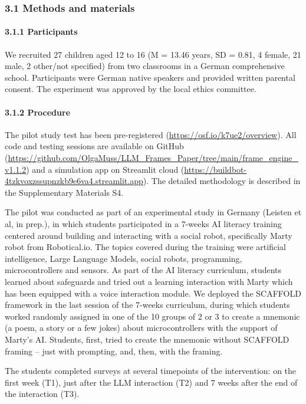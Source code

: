 \documentclass[fleqn,10pt]{wlscirep}
\begin{document}
\subsubsection*{3.1 Methods and materials}

\paragraph*{3.1.1 Participants}

We recruited 27 children aged 12 to 16 (M = 13.46 years, SD = 0.81, 4 female, 21 male, 2 other/not specified) from two classrooms in a German comprehensive school. Participants were German native speakers and provided written parental consent. The experiment was approved by the local ethics committee.

\paragraph*{3.1.2 Procedure}

The pilot study test has been pre-registered (\url{https://osf.io/k7ue2/overview}). All code and testing sessions are available on GitHub (\url{https://github.com/OlgaMuss/LLM_Frames_Paper/tree/main/frame_engine_v1.1.2}) and a simulation app on Streamlit cloud (\url{https://buildbot-4tzkvoxzssupnzkb9e6va4.streamlit.app}). The detailed methodology is described in the Supplementary Materials S4.

The pilot was conducted as part of an experimental study in Germany (Leisten et al, in prep.), in which students participated in a 7-weeks AI literacy training centered around building and interacting with a social robot, specifically Marty robot from Robotical.io. The topics covered during the training were artificial intelligence, Large Language Models, social robots, programming, microcontrollers and sensors. As part of the AI literacy curriculum, students learned about safeguards and tried out a learning interaction with Marty which has been equipped with a voice interaction module. We deployed the SCAFFOLD framework in the last session of the 7-weeks curriculum, during which students worked randomly assigned in one of the 10 groups of 2 or 3 to create a mnemonic (a poem, a story or a few jokes) about microcontrollers with the support of Marty's AI. Students, first, tried to create the mnemonic without SCAFFOLD framing – just with prompting, and, then, with the framing.

The students completed surveys at several timepoints of the intervention: on the first week (T1), just after the LLM interaction (T2) and 7 weeks after the end of the interaction (T3).
\end{document}
